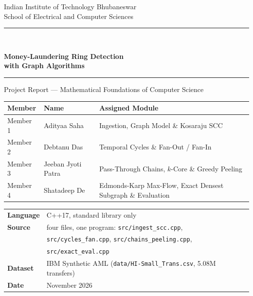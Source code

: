 \documentclass[11pt,a4paper]{article}
\theoremstyle{definition}
\begin{document}
\begin{titlepage}
\thispagestyle{empty}
\centering
\vspace*{0.6cm}
{\large Indian Institute of Technology Bhubaneswar\\
School of Electrical and Computer Sciences\par}

\vspace{1.2cm}
{\color{accent}\rule{\linewidth}{1.2pt}}\\[0.7cm]
{\Huge\bfseries Money-Laundering Ring Detection\\[0.25cm] with Graph Algorithms\par}
\vspace{0.55cm}
{\color{accent}\rule{\linewidth}{1.2pt}}

\vspace{0.9cm}
{\large Project Report --- Mathematical Foundations of Computer Science\par}

\vspace{1.4cm}
\begin{tabular}{lll}
\toprule
\textbf{Member} & \textbf{Name} & \textbf{Assigned Module} \\
\midrule
Member 1 & Adityaa Saha & Ingestion, Graph Model \& Kosaraju SCC \\
Member 2 & Debtanu Das & Temporal Cycles \& Fan-Out / Fan-In \\
Member 3 & Jeeban Jyoti Patra & Pass-Through Chains, $k$-Core \& Greedy Peeling \\
Member 4 & Shatadeep De & Edmonds-Karp Max-Flow, Exact Densest Subgraph \& Evaluation \\
\bottomrule
\end{tabular}

\vspace{1.8cm}
\raggedright
\hspace*{1.2cm}%
\begin{tabular}{@{}ll@{}}
\textbf{Language} & C++17, standard library only \\
\textbf{Source}   & four files, one program: \texttt{src/ingest\_scc.cpp}, \\
                  & \texttt{src/cycles\_fan.cpp}, \texttt{src/chains\_peeling.cpp}, \\
                  & \texttt{src/exact\_eval.cpp} \\
\textbf{Dataset}  & IBM Synthetic AML (\texttt{data/HI-Small\_Trans.csv}, 5.08M transfers) \\
\textbf{Date}     & November 2026 \\
\end{tabular}

\vfill
\end{titlepage}
\end{document}
